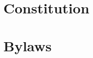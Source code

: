 \documentclass{article}
\begin{document}



\part{Constitution}













\part{Bylaws}




\end{document}

